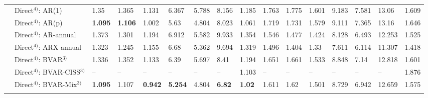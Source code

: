 \begin{table}[!h]
\begin{tabular}{llllllllllllllll}
 & Direct$^{4)}$: AR(1) & 1.35 & 1.365 & 1.131 & 6.367 & 5.788 & 8.156 & 1.185 & 1.763 & 1.775 & 1.601 & 9.183 & 7.581 & 13.06 & 1.609\\
 & Direct$^{4)}$: AR(p) & \textbf{1.095} & \textbf{1.106} & 1.002 & 5.63 & 4.804 & 8.023 & 1.061 & 1.719 & 1.731 & 1.579 & 9.111 & 7.365 & 13.16 & 1.646\\
 & Direct$^{4)}$: AR-annual & 1.373 & 1.301 & 1.194 & 6.912 & 5.582 & 9.933 & 1.354 & 1.546 & 1.477 & 1.424 & 8.128 & 6.493 & 12.253 & 1.525\\
 & Direct$^{4)}$: ARX-annual & 1.323 & 1.245 & 1.155 & 6.68 & 5.362 & 9.694 & 1.319 & 1.496 & 1.404 & 1.33 & 7.611 & 6.114 & 11.307 & 1.418\\
 & Direct$^{4)}$: BVAR$^{3)}$ & 1.336 & 1.352 & 1.133 & 6.39 & 5.697 & 8.41 & 1.194 & 1.651 & 1.661 & 1.533 & 8.848 & 7.14 & 12.818 & 1.601\\
 & Direct$^{4)}$: BVAR-CISS$^{3)}$ & -- & -- & -- & -- & -- & -- & 1.103 & -- & -- & -- & -- & -- & -- & 1.876\\
 & Direct$^{4)}$: BVAR-Mix$^{3)}$ & \textbf{1.095} & 1.107 & \textbf{0.942} & \textbf{5.254} & 4.804 & \textbf{6.82} & \textbf{1.02} & 1.611 & 1.62 & 1.501 & 8.729 & 6.942 & 12.659 & 1.575\\
\cellcolor{gray!15}{} & \cellcolor{gray!15}{Simple Ensemble$^{5)}$} & \cellcolor{gray!15}{1.18} & \cellcolor{gray!15}{1.196} & \cellcolor{gray!15}{0.993} & \cellcolor{gray!15}{5.617} & \cellcolor{gray!15}{5.072} & \cellcolor{gray!15}{7.168} & \cellcolor{gray!15}{1.069} & \cellcolor{gray!15}{1.509} & \cellcolor{gray!15}{1.53} & \cellcolor{gray!15}{1.403} & \cellcolor{gray!15}{8.122} & \cellcolor{gray!15}{6.436} & \cellcolor{gray!15}{11.922} & \cellcolor{gray!15}{1.455}\\
\bottomrule
\end{tabular}
\end{table}
